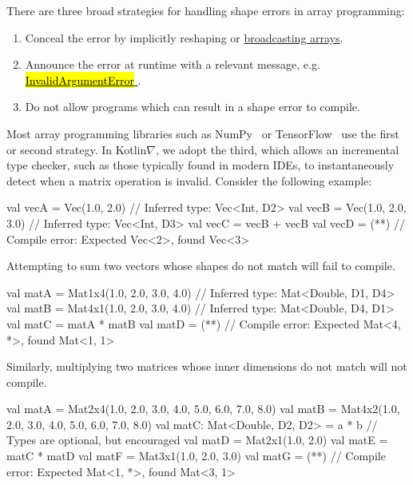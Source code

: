 \documentclass[12pt,initial,twoside,maitrise]{dms}
\makeatletter
\def\uwave{\bgroup \markoverwith{\lower3.5\p@\hbox{\sixly \textcolor{red}{\char58}}}\ULon}
\newcommand{\inline}[1]{%
    \begingroup%
    \sethlcolor{slightgray}%
    \hl{\ttfamily\footnotesize #1}%
    \endgroup
}
\numberwithin{equation}{section}
\numberwithin{table}{chapter}
\numberwithin{figure}{chapter}
\makeatother
\begin{document}
\noindent There are three broad strategies for handling shape errors in array programming: \\
%
\begin{enumerate}
    \item Conceal the error by implicitly reshaping or \href{https://docs.scipy.org/doc/numpy-1.15.0/user/basics.broadcasting.html}{broadcasting arrays}.
    \item Announce the error at runtime with a relevant message, e.g.~\href{https://www.tensorflow.org/api_docs/python/tf/errors/InvalidArgumentError}{\inline{InvalidArgumentError}}.
    \item Do not allow programs which can result in a shape error to compile. \\
\end{enumerate}
%
Most array programming libraries such as NumPy~\citep{van2011numpy} or TensorFlow~\citep{abadi2016tensorflow} use the first or second strategy. In Kotlin$\nabla$, we adopt the third, which allows an incremental type checker, such as those typically found in modern IDEs, to instantaneously detect when a matrix operation is invalid. Consider the following example:
%
\begin{kotlinlisting}
val vecA = Vec(1.0, 2.0)      // Inferred type: Vec<Int, D2>
val vecB = Vec(1.0, 2.0, 3.0) // Inferred type: Vec<Int, D3>
val vecC = vecB + vecB
val vecD = (*\uwave{vecA + vecB}*) // Compile error: Expected Vec<2>, found Vec<3>
\end{kotlinlisting}
%
Attempting to sum two vectors whose shapes do not match will fail to compile.
%
\begin{kotlinlisting}
val matA = Mat1x4(1.0, 2.0, 3.0, 4.0) // Inferred type: Mat<Double, D1, D4>
val matB = Mat4x1(1.0, 2.0, 3.0, 4.0) // Inferred type: Mat<Double, D4, D1>
val matC = matA * matB
val matD = (*\uwave{matA *\ matC}*) // Compile error: Expected Mat<4, *>, found Mat<1, 1>
\end{kotlinlisting}
%
Similarly, multiplying two matrices whose inner dimensions do not match will not compile.
%
\begin{kotlinlisting}
val matA = Mat2x4(1.0, 2.0, 3.0, 4.0,
                  5.0, 6.0, 7.0, 8.0)
val matB = Mat4x2(1.0, 2.0,
                  3.0, 4.0,
                  5.0, 6.0,
                  7.0, 8.0)
val matC: Mat<Double, D2, D2> = a * b // Types are optional, but encouraged
val matD = Mat2x1(1.0, 2.0)
val matE = matC * matD
val matF = Mat3x1(1.0, 2.0, 3.0)
val matG = (*\uwave{matE *\ matF}*) // Compile error: Expected Mat<1, *>, found Mat<3, 1>
\end{kotlinlisting}
\end{document}
